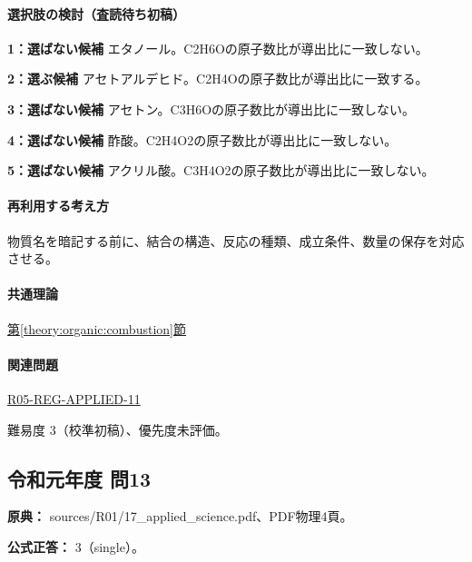 \paragraph{選択肢の検討（査読待ち初稿）}\mbox{}\par

\noindent\textbf{1：選ばない候補} エタノール。C2H6Oの原子数比が導出比に一致しない。\par

\noindent\textbf{2：選ぶ候補} アセトアルデヒド。C2H4Oの原子数比が導出比に一致する。\par

\noindent\textbf{3：選ばない候補} アセトン。C3H6Oの原子数比が導出比に一致しない。\par

\noindent\textbf{4：選ばない候補} 酢酸。C2H4O2の原子数比が導出比に一致しない。\par

\noindent\textbf{5：選ばない候補} アクリル酸。C3H4O2の原子数比が導出比に一致しない。\par

\paragraph{再利用する考え方} 物質名を暗記する前に、結合の構造、反応の種類、成立条件、数量の保存を対応させる。

\paragraph{共通理論} \hyperref[theory:organic:combustion]{第\ref*{theory:organic:combustion}節}

\paragraph{関連問題} \hyperref[q:r05-reg-applied-11]{R05-REG-APPLIED-11}

\par 難易度 3（校準初稿）、優先度未評価。

\subsection{令和元年度 問13}
\label{q:r01-reg-applied-13}

\noindent\textbf{原典：} sources/R01/17\_applied\_science.pdf、PDF物理4頁。

\textbf{公式正答：} 3（single）。

